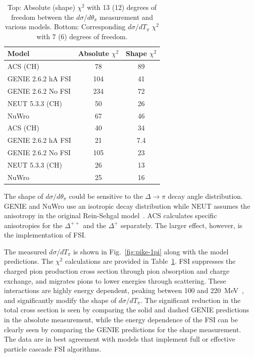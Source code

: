 \begingroup
\squeezetable
\begin{table}[h]
\begin{tabular}{l|cc}
\hline\hline
Model & Absolute $\chi^{2}$ & Shape $\chi^{2}$ \\ 
\hline 
ACS (CH) & 78 & 89 \\ 
GENIE 2.6.2 hA FSI & 104 & 41 \\
GENIE 2.6.2 No FSI & 234 & 72 \\
NEUT 5.3.3 (CH) & 50 & 26 \\
NuWro & 67 & 46 \\
\hline\hline
ACS (CH) & 40 & 34  \\ 
GENIE 2.6.2 hA FSI & 21 & 7.4 \\
GENIE 2.6.2 No FSI & 105 & 23 \\
NEUT 5.3.3 (CH) & 26 & 13 \\
NuWro & 25 & 16 \\
\hline\hline
\end{tabular}
\caption{Top: Absolute (shape) $\chi^{2}$ with 13 (12) degrees of freedom between the \cconepi $d\sigma / d\theta_\pi$ measurement and various models. 
Bottom: Corresponding \cconepi $d\sigma / dT_\pi$ $\chi^{2}$ with 7 (6) degrees of freedom.}
\label{tab:chi2}
\end{table}
\endgroup
 
The shape of $d\sigma/d\theta_\pi$ could be 
sensitive to the $\Delta \rightarrow \pi$ decay angle distribution.  
GENIE and NuWro use an isotropic decay 
distribution while NEUT assumes the anisotropy in the original Rein-Sehgal 
model~\cite{Rein:1980wg}.  ACS calculates specific anisotropies 
for the $\Delta^{++}$ and the $\Delta^+$ separately.  
The larger effect, however, is the implementation of FSI.  

The measured \cconepi $d\sigma/dT_\pi$ is shown in  
Fig.~\ref{fig:pike-1pi} along with the model predictions.  The $\chi^2$ 
calculations are provided in Table~\ref{tab:chi2}.
FSI suppresses the charged pion production cross section through pion 
absorption and charge exchange, and migrates pions to lower energies 
through scattering.  These interactions are highly energy dependent, 
peaking between 100 and 220~MeV~\cite{Leitner:2008wx}, and significantly 
modify the shape of $d\sigma/dT_\pi$.  The significant reduction in the total cross section is seen
by comparing the solid and dashed GENIE predictions in the absolute measurement, while the energy dependence 
of the FSI can be clearly seen by comparing the GENIE predictions for the shape measurement.  
The data are in best agreement with models that implement full or effective particle cascade FSI algorithms.     


